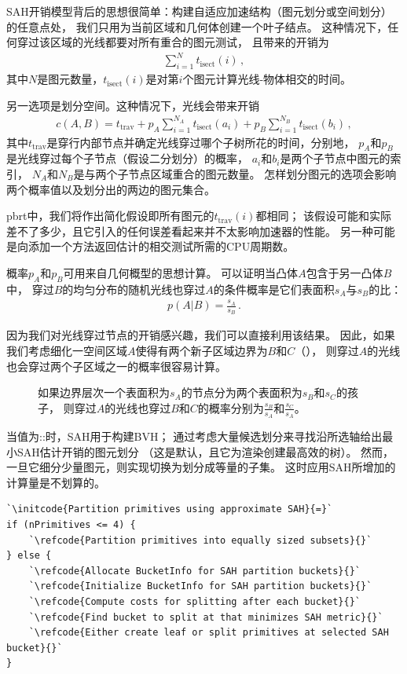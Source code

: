 SAH开销模型背后的思想很简单：构建自适应加速结构（图元划分或空间划分）的任意点处，
我们只用为当前区域和几何体创建一个叶子结点。
这种情况下，任何穿过该区域的光线都要对所有重合的图元测试，
且带来的开销为
\begin{align*}
    \sum\limits_{i=1}^{N}{t_{\mathrm{isect}}(i)}\, ,
\end{align*}
其中$N$是图元数量，$t_{\mathrm{isect}}(i)$是对第$i$个图元计算光线-物体相交的时间。

另一选项是划分空间。这种情况下，光线会带来开销
\begin{align}\label{eq:4.1}
    c(A,B)=t_{\mathrm{trav}}+p_A\sum\limits_{i=1}^{N_A}{t_\mathrm{isect}(a_i)}+p_B\sum\limits_{i=1}^{N_B}{t_{\mathrm{isect}}(b_i)}\, ,
\end{align}
其中$t_{\mathrm{trav}}$是穿行内部节点并确定光线穿过哪个子树所花的时间，分别地，
$p_A$和$p_B$是光线穿过每个子节点（假设二分划分）的概率，
$a_i$和$b_i$是两个子节点中图元的索引，
$N_A$和$N_B$是与两个子节点区域重合的图元数量。
怎样划分图元的选项会影响两个概率值以及划分出的两边的图元集合。

pbrt中，我们将作出简化假设即所有图元的$t_{\mathrm{trav}}(i)$都相同；
该假设可能和实际差不了多少，且它引入的任何误差看起来并不太影响加速器的性能。
另一种可能是向添加一个方法返回估计的相交测试所需的CPU周期数。

概率$p_A$和$p_B$可用来自几何概型的思想计算。
可以证明当凸体$A$包含于另一凸体$B$中，
穿过$B$的均匀分布的随机光线也穿过$A$的条件概率是它们表面积$s_A$与$s_B$的比：
\begin{align*}
    \displaystyle p(A|B)=\frac{s_A}{s_B}\, .
\end{align*}

因为我们对光线穿过节点的开销感兴趣，我们可以直接利用该结果。
因此，如果我们考虑细化一空间区域$A$使得有两个新子区域边界为$B$和$C$（），
则穿过$A$的光线也会穿过两个子区域之一的概率很容易计算。
\begin{figure}[htbp]
    \centering
    \caption{如果边界层次一个表面积为$s_A$的节点分为两个表面积为$s_B$和$s_C$的孩子，
        则穿过$A$的光线也穿过$B$和$C$的概率分别为$\displaystyle\frac{s_B}{s_A}$和$\displaystyle\frac{s_C}{s_A}$。}
    \label{fig:4.5}
\end{figure}

当值为{\ttfamily{}::}时，SAH用于构建BVH；
通过考虑大量候选划分来寻找沿所选轴给出最小SAH估计开销的图元划分
（这是默认，且它为渲染创建最高效的树）。
然而，一旦它细分少量图元，则实现切换为划分成等量的子集。
这时应用SAH所增加的计算量是不划算的。
\begin{lstlisting}
`\initcode{Partition primitives using approximate SAH}{=}`
if (nPrimitives <= 4) {
    `\refcode{Partition primitives into equally sized subsets}{}`
} else {
    `\refcode{Allocate BucketInfo for SAH partition buckets}{}`
    `\refcode{Initialize BucketInfo for SAH partition buckets}{}`
    `\refcode{Compute costs for splitting after each bucket}{}`
    `\refcode{Find bucket to split at that minimizes SAH metric}{}`
    `\refcode{Either create leaf or split primitives at selected SAH bucket}{}`
}
\end{lstlisting}

